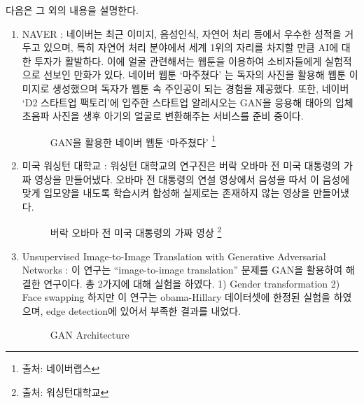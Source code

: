 \documentclass{oblivoir}
\begin{document}
다음은 그 외의 내용을 설명한다.
\begin{enumerate}%

\item NAVER : 네이버는 최근 이미지, 음성인식, 자연어 처리 등에서 우수한 성적을 거두고 있으며, 특히 자연어 처리 분야에서 세계 1위의 자리를 차지할 만큼 AI에 대한 투자가 활발하다. 이에 얼굴 관련해서는 웹툰을 이용하여 소비자들에게 실험적으로 선보인 만화가 있다. 네이버 웹툰 ‘마주쳤다’ 는 독자의 사진을 활용해 웹툰 이미지로 생성했으며 독자가 웹툰 속 주인공이 되는 경험을 제공했다. 또한, 네이버 ‘D2 스타트업 팩토리’에 입주한 스타트업 알레시오는 GAN을 응용해 태아의 입체 초음파 사진을 생후 아기의 얼굴로 변환해주는 서비스를 준비 중이다.

\begin{figure}[h!]
    \centering
    \caption{ GAN을 활용한 네이버 웹툰 ‘마주쳤다’ \protect\footnote{출처: 네이버랩스}}
\end{figure}


\item 미국 워싱턴 대학교 : 워싱턴 대학교의 연구진은 버락 오바마 전 미국 대통령의 가짜 영상을 만들어냈다. 오바마 전 대통령의 연설 영상에서 음성을 따서 이 음성에 맞게 입모양을 내도록 학습시켜 합성해 실제로는 존재하지 않는 영상을 만들어냈다. 

\begin{figure}[h!]
    \centering
    \caption{  버락 오바마 전 미국 대통령의 가짜 영상 \protect\footnote{출처: 워싱턴대학교}}
\end{figure}


\item Unsupervised Image-to-Image Translation with Generative Adversarial Networks : 이 연구는 “image-to-image translation” 문제를 GAN을 활용하여 해결한 연구이다. 총 2가지에 대해 실험을 하였다. 1) Gender transformation 2) Face swapping 하지만 이 연구는 obama-Hillary 데이터셋에 한정된 실험을 하였으며, edge detection에 있어서 부족한 결과를 내었다.

\begin{figure}[h!]
    \centering
    \caption{ GAN Architecture\cite{reference5}}
\end{figure}

\end{enumerate}
\end{document}
